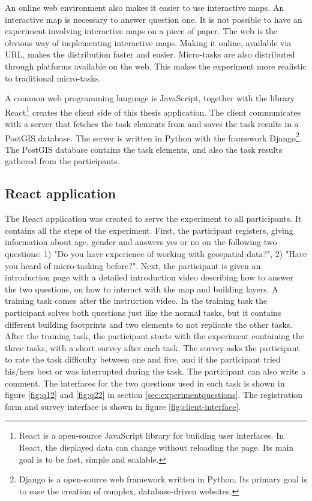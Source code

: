 An online web environment also makes it easier to use interactive maps. An interactive map is necessary to answer question one. It is not possible to have an experiment involving interactive maps on a piece of paper. The web is the obvious way of implementing interactive maps. Making it online, available via URL, makes the distribution faster and easier. Micro-tasks are also distributed through platforms available on the web. This makes the experiment more realistic to traditional micro-tasks. 

A common web programming language is JavaScript, together with the library React\footnote{React is a open-source JavaScript library for building user interfaces. In React, the displayed data can change without reloading the page. Its main goal is to be fast, simple and scalable.} creates the client side of this thesis application. The client communicates with a server that fetches the task elements from and saves the task results in a PostGIS database. The server is written in Python with the framework Django\footnote{Django is a open-source web framework written in Python. Its primary goal is to ease the creation of complex, database-driven websites.}. The PostGIS database contains the task elements, and also the task results gathered from the participants. 
 
\subsection{React application}
The React application was created to serve the experiment to all participants. It contains all the steps of the experiment. First, the participant registers, giving information about age, gender and answers yes or no on the following two questions: 1) "Do you have experience of working with geospatial data?", 2) "Have you heard of micro-tasking before?". Next, the participant is given an introduction page with a detailed introduction video describing how to answer the two questions, on how to interact with the map and building layers. A training task comes after the instruction video. In the training task the participant solves both questions just like the normal tasks, but it contains different building footprints and two elements to not replicate the other tasks. After the training task, the participant starts with the experiment containing the three tasks, with a short survey after each task. The survey asks the participant to rate the task difficulty between one and five, and if the participant tried his/hers best or was interrupted during the task. The participant can also write a comment. The interfaces for the two questions used in each task is shown in figure \ref{fig:q12} and \ref{fig:q22} in section \ref{sec:experimentquestions}. The registration form and survey interface is shown in figure \ref{fig:client-interface}. 

